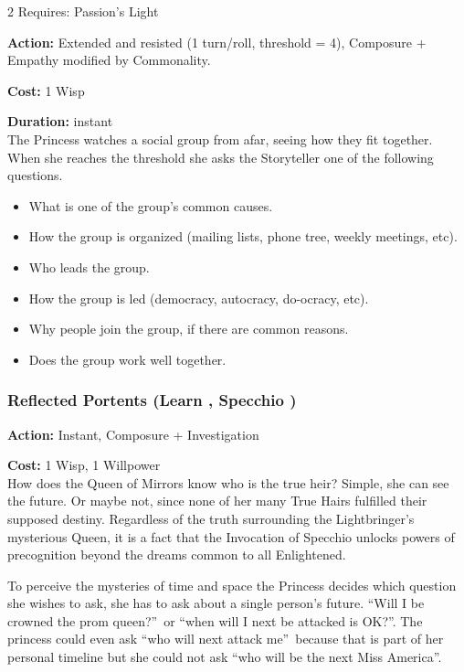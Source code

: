 \begin{multicols}{2}
\noindent Requires: Passion's Light

\noindent \textbf{Action:} Extended and resisted (1 turn/roll, threshold = 4), Composure + Empathy modified by Commonality.

\noindent \textbf{Cost:} 1 Wisp

\noindent \textbf{Duration:} instant \\

\noindent The Princess watches a social group from afar, seeing how they fit together. When she reaches the threshold she asks the Storyteller one of the following questions. 

    \begin{itemize}\item What is one of the group's common causes.
    \item How the group is organized (mailing lists, phone tree, weekly meetings, etc).
    \item Who leads the group. 
    \item How the group is led (democracy, autocracy, do-ocracy, etc).
    \item Why people join the group, if there are common reasons.
    \item Does the group work well together.
    \end{itemize}

\subsubsection*{Reflected Portents (Learn \textbullet\textbullet\textbullet, Specchio \textbullet\textbullet\textbullet)}

\noindent \textbf{Action:} Instant, Composure + Investigation

\noindent \textbf{Cost:} 1 Wisp, 1 Willpower \\

\noindent How does the Queen of Mirrors know who is the true heir? Simple, she can see the future. Or maybe not, since none of her many True Hairs fulfilled their supposed destiny. Regardless of the truth surrounding the Lightbringer's mysterious Queen, it is a fact that the Invocation of Specchio unlocks powers of precognition beyond the dreams common to all Enlightened.

To perceive the mysteries of time and space the Princess decides which question she wishes to ask, she has to ask about a single person's future. \textquotedblleft Will I be crowned the prom queen?\textquotedblright\, or \textquotedblleft when will I next be attacked is OK?\textquotedblright. The princess could even ask \textquotedblleft who will next attack me\textquotedblright\, because that is part of her personal timeline but she could not ask \textquotedblleft who will be the next Miss America\textquotedblright.


\end{multicols}
